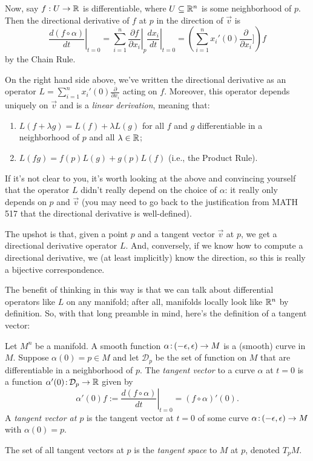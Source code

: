 Now, say $f: U \to \mathbb{R}$ is differentiable, where $U \subseteq \mathbb{R}^n$ is some neighborhood of $p$. Then the directional derivative of $f$ at $p$ in the direction of $\vec{v}$ is 
\[
	\left. \frac{d(f \circ \alpha)}{dt} \right|_{t=0} = \sum_{i=1}^n \left.\frac{\partial f}{\partial x_i}\right|_p \left. \frac{d x_i}{dt} \right|_{t=0} = \left(\sum_{i=1}^n x_i'(0) \frac{\partial}{\partial x_i}]\right)f
\]
by the Chain Rule. 

On the right hand side above, we've written the directional derivative as an operator $L = \sum_{i=1}^n x_i'(0) \frac{\partial}{\partial x_i}$ acting on $f$. Moreover, this operator depends uniquely on $\vec{v}$ and is a \emph{linear derivation}, meaning that:
\begin{enumerate}
	\item \label{it:linearity of vector field} $L(f + \lambda g) = L(f) + \lambda L(g)$ for all $f$ and $g$ differentiable in a neighborhood of $p$ and all $\lambda \in \mathbb{R}$;
	\item $L(f g) = f(p) L(g) + g(p) L(f)$ (i.e., the Product Rule).
\end{enumerate}

If it's not clear to you, it's worth looking at the above and convincing yourself that the operator $L$ didn't really depend on the choice of $\alpha$: it really only depends on $p$ and $\vec{v}$ (you may need to go back to the justification from MATH 517 that the directional derivative is well-defined).

The upshot is that, given a point $p$ and a tangent vector $\vec{v}$ at $p$, we get a directional derivative operator $L$. And, conversely, if we know how to compute a directional derivative, we (at least implicitly) know the direction, so this is really a bijective correspondence.

The benefit of thinking in this way is that we can talk about differential operators like $L$ on any manifold; after all, manifolds locally look like $\mathbb{R}^n$ by definition. So, with that long preamble in mind, here's the definition of a tangent vector:

\begin{definition}\label{def:tangent vector}
	Let $M^n$ be a manifold. A smooth function $\alpha\colon\thinspace\!\! (-\epsilon, \epsilon) \to M$ is a (smooth) curve in $M$. Suppose $\alpha(0) = p \in M$ and let $\mathcal{D}_p$ be the set of function on $M$ that are differentiable in a neighborhood of $p$. The \emph{tangent vector} to a curve $\alpha$ at $t=0$ is a function $\alpha'(0)\colon\thinspace\!\! \mathcal{D}_p \to \mathbb{R}$ given by
	\[
		\alpha'(0)f := \left. \frac{d(f\circ \alpha)}{dt} \right|_{t=0} = (f\circ \alpha)'(0).
	\] 
	A \emph{tangent vector at $p$} is the tangent vector at $t=0$ of some curve $\alpha\colon\thinspace\!\! (-\epsilon, \epsilon) \to M$ with $\alpha(0) = p$.
	
	The set of all tangent vectors at $p$ is the \emph{tangent space} to $M$ at $p$, denoted $T_pM$.
\end{definition}

